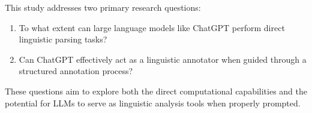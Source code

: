 This study addresses two primary research questions:

\begin{enumerate}
    \item To what extent can large language models like ChatGPT perform direct linguistic parsing tasks?
    \item Can ChatGPT effectively act as a linguistic annotator when guided through a structured annotation process?
\end{enumerate}

These questions aim to explore both the direct computational capabilities and the potential for LLMs to serve as linguistic analysis tools when properly prompted. 